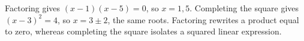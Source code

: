 Factoring gives $(x-1)(x-5)=0$, so $x=1,5$. Completing the square gives $(x-3)^2=4$, so $x=3\pm2$, the same roots. Factoring rewrites a product equal to zero, whereas completing the square isolates a squared linear expression.
